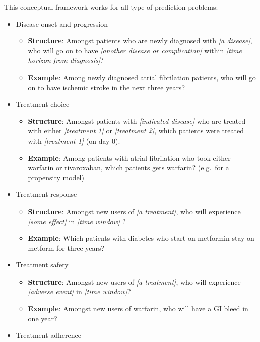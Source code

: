 \documentclass[]{book}
\providecommand{\tightlist}{%
  \setlength{\itemsep}{0pt}\setlength{\parskip}{0pt}}
\begin{document}
This conceptual framework works for all type of prediction problems:

\begin{itemize}
\tightlist
\item
  Disease onset and progression

  \begin{itemize}
  \tightlist
  \item
    \textbf{Structure}: Amongst patients who are newly diagnosed with
    \emph{{[}a disease{]}}, who will go on to have \emph{{[}another
    disease or complication{]}} within \emph{{[}time horizon from
    diagnosis{]}}?
  \item
    \textbf{Example}: Among newly diagnosed atrial fibrilation patients,
    who will go on to have ischemic stroke in the next three years?
  \end{itemize}
\item
  Treatment choice

  \begin{itemize}
  \tightlist
  \item
    \textbf{Structure}: Amongst patients with \emph{{[}indicated
    disease{]}} who are treated with either \emph{{[}treatment 1{]}} or
    \emph{{[}treatment 2{]}}, which patients were treated with
    \emph{{[}treatment 1{]}} (on day 0).
  \item
    \textbf{Example}: Among patients with atrial fibrilation who took
    either warfarin or rivaroxaban, which patients gets warfarin?
    (e.g.~for a propensity model)
  \end{itemize}
\item
  Treatment response

  \begin{itemize}
  \tightlist
  \item
    \textbf{Structure}: Amongst new users of \emph{{[}a treatment{]}},
    who will experience \emph{{[}some effect{]}} in \emph{{[}time
    window{]}} ?
  \item
    \textbf{Example}: Which patients with diabetes who start on
    metformin stay on metform for three years?
  \end{itemize}
\item
  Treatment safety

  \begin{itemize}
  \tightlist
  \item
    \textbf{Structure}: Amongst new users of \emph{{[}a treatment{]}},
    who will experience \emph{{[}adverse event{]}} in \emph{{[}time
    window{]}}?
  \item
    \textbf{Example}: Amongst new users of warfarin, who will have a GI
    bleed in one year?
  \end{itemize}
\item
  Treatment adherence


\end{itemize}
\end{document}
